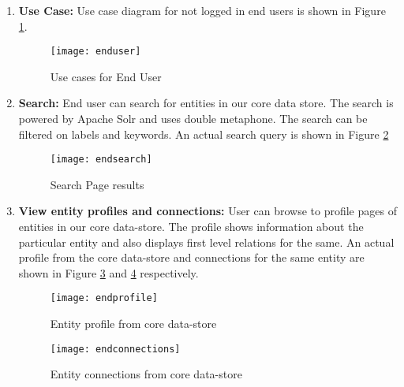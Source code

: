 \begin{enumerate}

\item \textbf{Use Case:} Use case diagram for not logged in end users is shown in Figure \ref{fig:enduser}.

\begin{figure}[H]
\begin{center}  
\texttt{[image: enduser]} 
\caption{Use cases for End User}
\label{fig:enduser}
\end{center}
\end{figure}




\item \textbf{Search:} End user can search for entities in our core data store. The search is powered by Apache Solr and uses double metaphone. The search can be filtered on labels and keywords. An actual search query is shown in Figure \ref{fig:endsearch} 

\begin{figure}[H]
\begin{center}  
\texttt{[image: endsearch]} 
\caption{Search Page results}
\label{fig:endsearch}
\end{center}
\end{figure}


\item \textbf{View entity profiles and connections:} User can browse to profile pages of entities in our core data-store. The profile shows information about the particular entity and also displays first level relations for the same. An actual profile from the core data-store and connections for the same entity are shown in Figure \ref{fig:endprofile} and \ref{fig:endconnections} respectively.


\begin{figure}[H]
\begin{center}  
\texttt{[image: endprofile]} 
\caption{Entity profile from core data-store}
\label{fig:endprofile}
\end{center}
\end{figure}



\begin{figure}[H]
\begin{center}  
\texttt{[image: endconnections]} 
\caption{Entity connections from core data-store}
\label{fig:endconnections}
\end{center}
\end{figure}



\end{enumerate}
